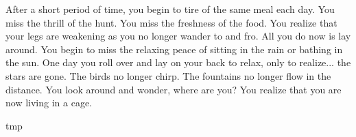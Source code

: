 \documentclass[10pt]{article}
\begin{document}
\begin{multicols}{2}
After a short period of time, you begin to tire of the same meal each day. You miss the thrill of the hunt. You miss the freshness of the food. You realize that your legs are weakening as you no longer wander to and fro. All you do now is lay around. You begin to miss the relaxing peace of sitting in the rain or bathing in the sun. One day you roll over and lay on your back to relax, only to realize... the stars are gone. The birds no longer chirp. The fountains no longer flow in the distance. You look around and wonder, where are you? You realize that you are now living in a cage.



\begin{thebibliography}{9}
	{\footnotesize
	 tmp

	}
\end{thebibliography}

\end{multicols}


\end{document}
